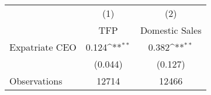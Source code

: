 {
\def\sym#1{\ifmmode^{#1}\else\(^{#1}\)\fi}
\begin{tabular}{l*{2}{c}}
\hline\hline
                    &\multicolumn{1}{c}{(1)}&\multicolumn{1}{c}{(2)}\\
                    &\multicolumn{1}{c}{TFP}&\multicolumn{1}{c}{Domestic Sales}\\
\hline
Expatriate CEO      &       0.124\sym{**} &       0.382\sym{**} \\
                    &     (0.044)         &     (0.127)         \\
\hline
Observations        &       12714         &       12466         \\
\hline\hline
\end{tabular}
}
